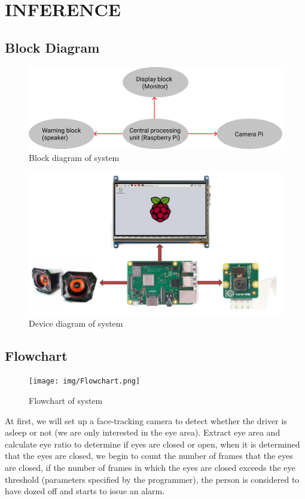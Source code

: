 \chapter{INFERENCE}

\renewcommand{\headrulewidth}{0.5pt}
\renewcommand{\footrulewidth}{0.5pt}
\thispagestyle{plain}
\pagestyle{fancy}
\fancyhf{}
\raggedright
{}

\section{Block Diagram}
    \begin{figure}[H]
        \centering
        \includegraphics[width=0.6\linewidth]{img/block-diagram.png}
        \caption{Block diagram of system}
    \end{figure}
    \begin{figure}[H]
        \centering
        \includegraphics[width=0.6\linewidth]{img/Device-diagram.png}
        \caption{Device diagram of system}
    \end{figure}

\section{Flowchart}
    \begin{figure}[H]
        \centering
        \texttt{[image: img/Flowchart.png]}
        \caption{Flowchart of system}
    \end{figure}
    At first, we will set up a face-tracking camera to detect whether the driver is asleep or not (we are only interested in the eye area). 
    Extract eye area and calculate eye ratio to determine if eyes are closed or open, when it is determined that the eyes are closed, we 
    begin to count the number of frames that the eyes are closed, if the number of frames in which the eyes are closed exceeds the eye 
    threshold (parameters specified by the programmer), the person is considered to have dozed off and starts to issue an alarm.

